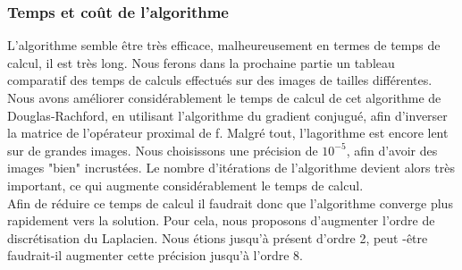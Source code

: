 \subsubsection{Temps et coût de l'algorithme}
L'algorithme semble être très efficace, malheureusement en termes de temps de calcul, il est très long. Nous ferons dans la prochaine partie un tableau comparatif des temps de calculs effectués sur des images de tailles différentes.\\
Nous avons améliorer considérablement le temps de calcul de cet algorithme de Douglas-Rachford, en utilisant l'algorithme du gradient conjugué, afin d'inverser la matrice de l'opérateur proximal de f. Malgré tout, l'lagorithme est encore lent sur de grandes images. Nous choisissons une précision de $10^{-5}$, afin d'avoir des images "bien" incrustées. Le nombre d'itérations de l'algorithme devient alors très important, ce qui augmente considérablement le temps de calcul.\\ Afin de réduire ce temps de calcul il faudrait donc que l'algorithme converge plus rapidement vers la solution. Pour cela, nous proposons d'augmenter l'ordre de discrétisation du Laplacien. Nous étions jusqu'à présent d'ordre 2, peut -être faudrait-il augmenter cette précision jusqu'à l'ordre 8. 
